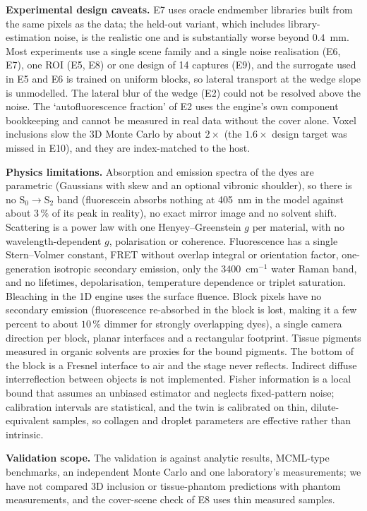 \documentclass[journal]{IEEEtran}
\begin{document}
\textbf{Experimental design caveats.} E7 uses oracle endmember libraries built from the same pixels as the data; the held-out variant, which includes library-estimation noise, is the realistic one and is substantially worse beyond $0.4$~mm. Most experiments use a single scene family and a single noise realisation (E6, E7), one ROI (E5, E8) or one design of 14 captures (E9), and the surrogate used in E5 and E6 is trained on uniform blocks, so lateral transport at the wedge slope is unmodelled. The lateral blur of the wedge (E2) could not be resolved above the noise. The `autofluorescence fraction' of E2 uses the engine's own component bookkeeping and cannot be measured in real data without the cover alone. Voxel inclusions slow the 3D Monte Carlo by about $2\times$ (the $1.6\times$ design target was missed in E10), and they are index-matched to the host.

\textbf{Physics limitations.} Absorption and emission spectra of the dyes are parametric (Gaussians with skew and an optional vibronic shoulder), so there is no S$_0\!\to$S$_2$ band (fluorescein absorbs nothing at 405~nm in the model against about $3\,\%$ of its peak in reality), no exact mirror image and no solvent shift. Scattering is a power law with one Henyey--Greenstein $g$ per material, with no wavelength-dependent $g$, polarisation or coherence. Fluorescence has a single Stern--Volmer constant, FRET without overlap integral or orientation factor, one-generation isotropic secondary emission, only the 3400~cm$^{-1}$ water Raman band, and no lifetimes, depolarisation, temperature dependence or triplet saturation. Bleaching in the 1D engine uses the surface fluence. Block pixels have no secondary emission (fluorescence re-absorbed in the block is lost, making it a few percent to about $10\,\%$ dimmer for strongly overlapping dyes), a single camera direction per block, planar interfaces and a rectangular footprint. Tissue pigments measured in organic solvents are proxies for the bound pigments. The bottom of the block is a Fresnel interface to air and the stage never reflects. Indirect diffuse interreflection between objects is not implemented. Fisher information is a local bound that assumes an unbiased estimator and neglects fixed-pattern noise; calibration intervals are statistical, and the twin is calibrated on thin, dilute-equivalent samples, so collagen and droplet parameters are effective rather than intrinsic.

\textbf{Validation scope.} The validation is against analytic results, MCML-type benchmarks, an independent Monte Carlo and one laboratory's measurements; we have not compared 3D inclusion or tissue-phantom predictions with phantom measurements, and the cover-scene check of E8 uses thin measured samples.
\end{document}
